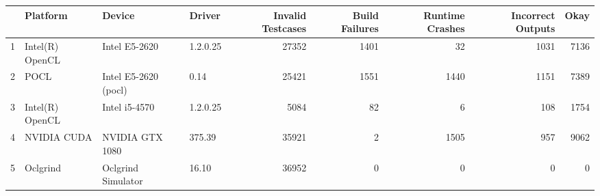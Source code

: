\begin{tabular}{llllrrrrr}
\toprule
{} &         Platform &                Device &    Driver &  Invalid Testcases &  Build Failures &  Runtime Crashes &  Incorrect Outputs &  Okay \\
\midrule
1 &  Intel(R) OpenCL &         Intel E5-2620 &  1.2.0.25 &              27352 &            1401 &               32 &               1031 &  7136 \\
2 &             POCL &  Intel E5-2620 (pocl) &      0.14 &              25421 &            1551 &             1440 &               1151 &  7389 \\
3 &  Intel(R) OpenCL &         Intel i5-4570 &  1.2.0.25 &               5084 &              82 &                6 &                108 &  1754 \\
4 &      NVIDIA CUDA &       NVIDIA GTX 1080 &    375.39 &              35921 &               2 &             1505 &                957 &  9062 \\
5 &         Oclgrind &    Oclgrind Simulator &     16.10 &              36952 &               0 &                0 &                  0 &     0 \\
\bottomrule
\end{tabular}
